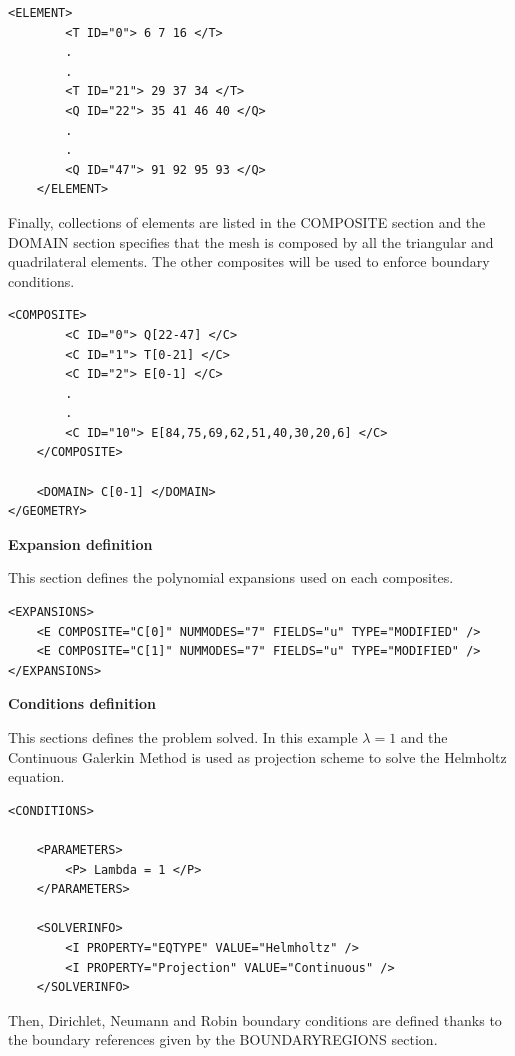 \begin{lstlisting}[style=XMLStyle]
<ELEMENT>
        <T ID="0"> 6 7 16 </T>
        .
        .
        <T ID="21"> 29 37 34 </T>
        <Q ID="22"> 35 41 46 40 </Q>
        .
        .
        <Q ID="47"> 91 92 95 93 </Q>
    </ELEMENT>
\end{lstlisting}

Finally, collections of elements are listed in the COMPOSITE section and the DOMAIN section specifies that 
the mesh is composed by all the triangular and quadrilateral elements. The other composites will be used to enforce boundary conditions.

\begin{lstlisting}[style=XMLStyle]
 <COMPOSITE>
        <C ID="0"> Q[22-47] </C>
        <C ID="1"> T[0-21] </C>
        <C ID="2"> E[0-1] </C>
        .
        .
        <C ID="10"> E[84,75,69,62,51,40,30,20,6] </C>
    </COMPOSITE>

    <DOMAIN> C[0-1] </DOMAIN>
</GEOMETRY>
\end{lstlisting}

\textbf{\footnotesize{Expansion definition}}

This section defines the polynomial expansions used on each composites.

\begin{lstlisting}[style=XMLStyle]
<EXPANSIONS>
    <E COMPOSITE="C[0]" NUMMODES="7" FIELDS="u" TYPE="MODIFIED" />
    <E COMPOSITE="C[1]" NUMMODES="7" FIELDS="u" TYPE="MODIFIED" />
</EXPANSIONS>
\end{lstlisting}

\textbf{\footnotesize{Conditions definition}}

This sections defines the problem solved. In this example $\lambda = 1$ and the Continuous Galerkin Method
is used as projection scheme to solve the Helmholtz equation.

\begin{lstlisting}[style=XMLStyle]
<CONDITIONS>

    <PARAMETERS>
        <P> Lambda = 1 </P>
    </PARAMETERS>

    <SOLVERINFO>
        <I PROPERTY="EQTYPE" VALUE="Helmholtz" />
        <I PROPERTY="Projection" VALUE="Continuous" />
    </SOLVERINFO>
\end{lstlisting}

Then, Dirichlet, Neumann and Robin boundary conditions are defined thanks to 
the boundary references given by the BOUNDARYREGIONS section.

